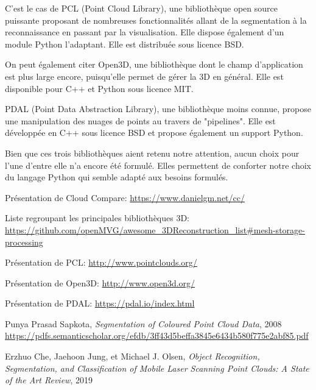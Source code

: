 \documentclass[12pt,titlepage,french]{article}
\begin{document}
C'est le cas de PCL (Point Cloud Library), une bibliothèque open source puissante proposant de nombreuses fonctionnalités allant de la segmentation à la reconnaissance en passant par la visualisation. Elle dispose également d'un module Python l'adaptant. Elle est distribuée sous licence BSD.

On peut également citer Open3D, une bibliothèque dont le champ d'application est plus large encore, puisqu'elle permet de gérer la 3D en général. Elle est disponible pour C++ et Python sous licence MIT.

PDAL (Point Data Abstraction Library), une bibliothèque moins connue, propose une manipulation des nuages de points au travers de "pipelines". Elle est développée en C++ sous licence BSD et propose également un support Python.

Bien que ces trois bibliothèques aient retenu notre attention, aucun choix pour l'une d'entre elle n'a encore été formulé. Elles permettent de conforter notre choix du langage Python qui semble adapté aux besoins formulés.

\begin{thebibliography}{9}
 Présentation de Cloud Compare:
\url{https://www.danielgm.net/cc/}

 Liste regroupant les principales bibliothèques 3D:
\url{https://github.com/openMVG/awesome_3DReconstruction_list#mesh-storage-processing}

 Présentation de PCL:
\url{http://www.pointclouds.org/}

 Présentation de Open3D:
\url{http://www.open3d.org/}

 Présentation de PDAL:
\url{https://pdal.io/index.html}

 Punya Prasad Sapkota, \textit{Segmentation of Coloured Point Cloud Data}, 2008
\url{https://pdfs.semanticscholar.org/efdb/3ff43d5beffa3845e6434b580f775e2abf85.pdf}

 Erzhuo Che, Jaehoon Jung, et Michael J. Olsen, \textit{Object Recognition, Segmentation, and Classification of Mobile Laser Scanning Point Clouds: A State of the Art Review}, 2019
\end{thebibliography}
\end{document}
